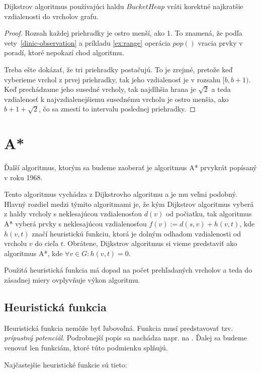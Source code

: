 \begin{theorem}
Dijkstrov algoritmus používajúci haldu $BucketHeap$ vráti korektné najkratšie vzdialenosti do vrcholov grafu.
\end{theorem}
\begin{proof}
Rozsah každej priehradky je ostro menší, ako 1. To znamená, že podľa vety~\ref{dinic-observation} a príkladu \ref{ex:range} operácia $pop()$ vracia prvky v poradí, ktoré
nepokazí chod algoritmu. 

Treba ešte dokázať, že tri priehradky postačujú. To je zrejmé,
pretože keď vyberieme vrchol z prvej priehradky, tak jeho vzdialenosť je v rozsahu $[b, b+1)$. Keď prechádzame jeho susedné vrcholy, tak najdlhšia hrana je $ \sqrt{2} $ a teda vzdialenosť k najvzdialenejšiemu susednému vrcholu je ostro menšia, ako $b+1+\sqrt{2}$, čo sa zmestí to intervalu poslednej priehradky.
\end{proof}


\section{A*}
Ďalší algoritmus, ktorým sa budeme zaoberať je algoritmus
A* \cite{astar72} prvykrát popísaný v roku 1968.

Tento algoritmus vychádza z Dijkstrovho algoritmu a je mu veľmi podobný. Hlavný rozdiel medzi týmito algoritmami je, že
kým Dijkstrov algoritmus vyberá z haldy vrcholy s neklesajúcou vzdialenosťou $ d(v) $ od počiatku, tak algoritmus A* vyberá prvky s neklesajúcou vzdialenosťou $ f(v) := d(s,v) + h(v,t) $, kde $ h(v, t) $ značí heuristickú funkciu, ktorá je dolným odhadom vzdialenosti od vrcholu $ v $ do cieľa $ t $. Obrátene, Dijkstrov algoritmus si vieme predstaviť ako algoritmus A*, kde $ \forall v \in G: h(v, t) = 0 $.

Použitá heuristická funkcia má dopad na počet prehľadaných vrcholov a teda do zásadnej miery ovplyvňuje výkon algoritmu.

\subsection{Heuristická funkcia}
 Heuristická funkcia nemôže byť ľubovoľná. Funkcia musí predstavovať tzv. {\sl prípustný potenciál}. Podrobnejší popis sa nachádza napr. na \cite{mares07} \cite{golberg01} \cite{goldbergharrelson05}. Ďalej sa budeme venovať len funkciám, ktoré túto podmienku splňujú.


Najčastejšie heuristické funkcie sú tieto:

